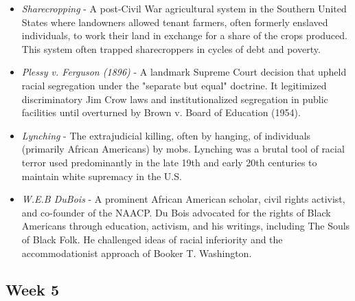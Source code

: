 \documentclass[12pt]{article}
\begin{document}
\begin{itemize}
    \item \textit{Sharecropping} - A post-Civil War agricultural system in the Southern United States where landowners allowed tenant farmers, often formerly enslaved individuals, to work their land in exchange for a share of the crops produced. This system often trapped sharecroppers in cycles of debt and poverty.
    
    \item \textit{Plessy v. Ferguson (1896)} - A landmark Supreme Court decision that upheld racial segregation under the "separate but equal" doctrine. It legitimized discriminatory Jim Crow laws and institutionalized segregation in public facilities until overturned by Brown v. Board of Education (1954).
    
    \item \textit{Lynching} - The extrajudicial killing, often by hanging, of individuals (primarily African Americans) by mobs. Lynching was a brutal tool of racial terror used predominantly in the late 19th and early 20th centuries to maintain white supremacy in the U.S.
    
    \item \textit{W.E.B DuBois} - A prominent African American scholar, civil rights activist, and co-founder of the NAACP. Du Bois advocated for the rights of Black Americans through education, activism, and his writings, including The Souls of Black Folk. He challenged ideas of racial inferiority and the accommodationist approach of Booker T. Washington.
\end{itemize}

\subsection*{Week 5}
\end{document}
